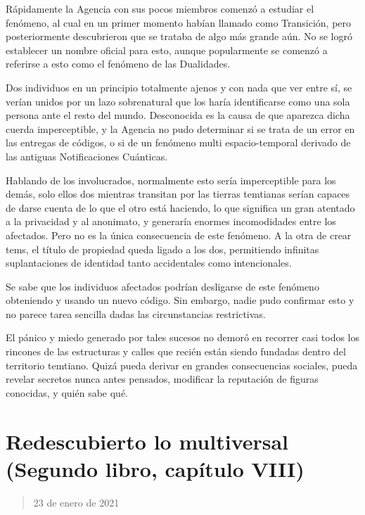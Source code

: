 \documentclass[
]{book}
\begin{document}
Rápidamente la Agencia con sus pocos miembros comenzó a estudiar el fenómeno, al cual en un primer momento habían llamado como Transición, pero posteriormente descubrieron que se trataba de algo más grande aún. No se logró establecer un nombre oficial para esto, aunque popularmente se comenzó a referirse a esto como el fenómeno de las Dualidades.

Dos individuos en un principio totalmente ajenos y con nada que ver entre sí, se verían unidos por un lazo sobrenatural que los haría identificarse como una sola persona ante el resto del mundo. Desconocida es la causa de que aparezca dicha cuerda imperceptible, y la Agencia no pudo determinar si se trata de un error en las entregas de códigos, o si de un fenómeno multi espacio-temporal derivado de las antiguas Notificaciones Cuánticas.

Hablando de los involucrados, normalmente esto sería imperceptible para los demás, solo ellos dos mientras transitan por las tierras temtianas serían capaces de darse cuenta de lo que el otro está haciendo, lo que significa un gran atentado a la privacidad y al anonimato, y generaría enormes incomodidades entre los afectados. Pero no es la única consecuencia de este fenómeno. A la otra de crear tems, el título de propiedad queda ligado a los dos, permitiendo infinitas suplantaciones de identidad tanto accidentales como intencionales.

Se sabe que los individuos afectados podrían desligarse de este fenómeno obteniendo y usando un nuevo código. Sin embargo, nadie pudo confirmar esto y no parece tarea sencilla dadas las circunstancias restrictivas.

El pánico y miedo generado por tales sucesos no demoró en recorrer casi todos los rincones de las estructuras y calles que recién están siendo fundadas dentro del territorio temtiano. Quizá pueda derivar en grandes consecuencias sociales, pueda revelar secretos nunca antes pensados, modificar la reputación de figuras conocidas, y quién sabe qué.

\hypertarget{redescubierto-lo-multiversal-segundo-libro-capuxedtulo-viii}{%
\section{Redescubierto lo multiversal (Segundo libro, capítulo VIII)}\label{redescubierto-lo-multiversal-segundo-libro-capuxedtulo-viii}}

\begin{quote}
23 de enero de 2021
\end{quote}
\end{document}
